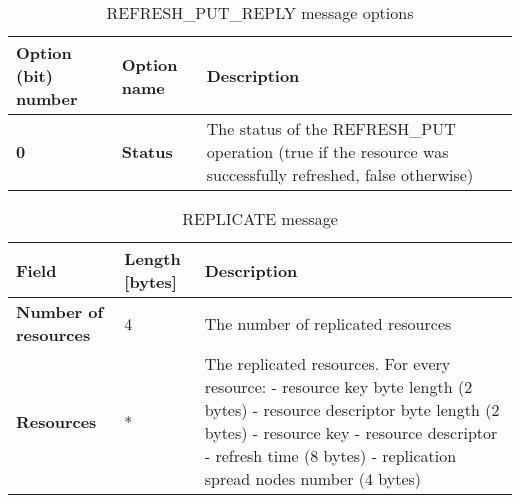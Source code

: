 \begin{table}[H]
\scriptsize
\begin{center}
\begin{tabular}{p{3cm} p{2cm} p{9.5cm}}
	\hline
	\textbf{Option (bit) number}			& \textbf{Option name}					& \textbf{Description}				\\[1mm]
    \hline
	\textbf{0}								& \textbf{Status}						& The status of the REFRESH\_PUT operation (true if the resource was successfully refreshed, false otherwise)						\\[1.5mm]
    \hline
\end{tabular}
\end{center}
\caption{REFRESH\_PUT\_REPLY message options}
\label{tab:mRefreshPutReplyOptions}
\end{table}









\begin{table}[H]
\scriptsize
\begin{center}
\begin{tabular}{p{3cm} p{2cm} p{9.5cm}}
	\hline
	\textbf{Field}						& \textbf{Length} [bytes]				& \textbf{Description}				\\[1mm]
    \hline
	\textbf{Number of resources}		& 4										& The number of replicated resources				\\[1.5mm]
	\textbf{Resources}					& *										& The replicated resources. For every resource: \newline - resource key byte length (2 bytes) \newline - resource descriptor byte length (2 bytes) \newline - resource key \newline - resource descriptor \newline - refresh time (8 bytes) \newline - replication spread nodes number (4 bytes)			\\[1.5mm]
    \hline
\end{tabular}
\end{center}
\caption{REPLICATE message}
\label{tab:mReplicate}
\end{table}












